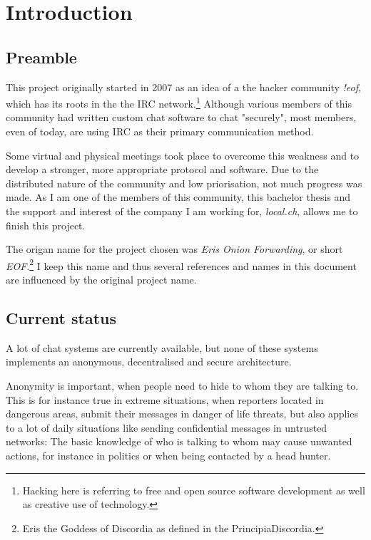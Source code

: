 \chapter{Introduction}
\section{Preamble}
This project originally started in 2007 as an idea of a the hacker
community \textit{!eof}, which has its roots in the the IRC
network.\footnote{Hacking here is referring to free and open source
software development as well as creative use of technology.}
Although various members of this community had written custom chat software
to chat "securely", most members, even of today, are using IRC as their
primary communication method.

Some virtual and physical meetings took place to overcome this weakness
and to develop a stronger, more appropriate protocol and software.
Due to the distributed nature of the community and low priorisation, not
much progress was made. As I am one of the members of this community,
this bachelor thesis and the support and interest
of the company I am working for, \textit{local.ch}, allows me to finish
this project.

The origan name for the project chosen was \textit{Eris Onion Forwarding}, or
short \textit{EOF}.\footnote{Eris the Goddess of Discordia as defined
in the PrincipiaDiscordia.}
I keep this name and thus several references and names
in this document are influenced by the original project name.
\section{Current status}
A lot of chat systems are currently available, 
but none of these systems implements an anonymous, decentralised and secure architecture.

Anonymity is important, when people need to hide to whom they are talking to.  
This is for instance true in extreme situations, when reporters located in 
dangerous areas, submit their messages in danger of life threats, but also 
applies to a lot of daily situations like sending confidential messages 
in untrusted networks: The basic knowledge of who is talking to whom may 
cause unwanted actions, for instance in politics or when being contacted by a head hunter.

